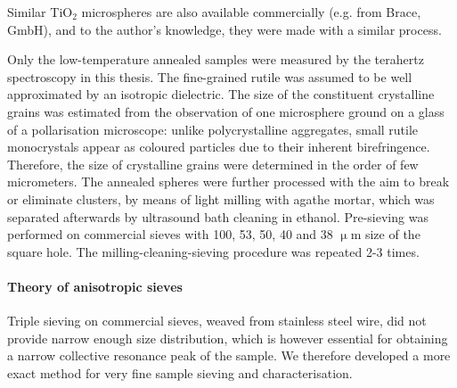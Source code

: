 Similar TiO$_{2}$ microspheres are also available commercially (e.g. from Brace, GmbH), and to the author's knowledge, they were made with a similar process.

Only the low-temperature annealed samples were measured by the terahertz spectroscopy in this thesis. The fine-grained rutile was assumed to be well approximated by an isotropic dielectric. The size of the constituent crystalline grains was estimated from the observation of one microsphere ground on a glass of a pollarisation microscope: unlike polycrystalline aggregates, small rutile monocrystals appear as coloured particles due to their inherent birefringence. Therefore, the size of crystalline grains were determined in the order of few micrometers.
The annealed spheres were further processed with the aim to break or eliminate clusters, by means of light milling with agathe mortar, which was separated afterwards by ultrasound bath cleaning in ethanol. Pre-sieving was performed on commercial sieves with 100, 53, 50, 40 and 38 $\upmu$m size of the square hole. The milling-cleaning-sieving procedure was repeated 2-3 times.


\paragraph{Theory of anisotropic sieves}%
Triple sieving on commercial sieves, weaved from stainless steel wire, did not provide narrow enough size distribution, which is however essential for obtaining a narrow collective resonance peak of the sample. We therefore developed a more exact method for very fine sample sieving and characterisation. 

